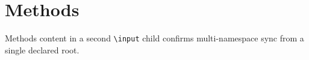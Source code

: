\section{Methods}
\label{sec:methods}

Methods content in a second \texttt{\textbackslash input} child confirms
multi-namespace sync from a single declared root.
